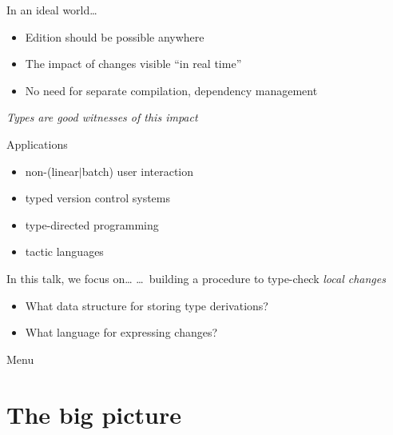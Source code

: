 \documentclass[ignorenonframetext,red]{beamer}
\begin{document}
\begin{frame}{In an ideal world\ldots}
  \begin{itemize}
  \item Edition should be possible anywhere
  \item The impact of changes visible “in real time”
  \item No need for separate compilation, dependency management
  \end{itemize}
  \pause
  \vspace{2em}
  \begin{center}
    {\large \it Types are good witnesses of this impact}
  \end{center}
  \vspace{1em}
  \pause
  \begin{block}{Applications}
    \small
    \begin{itemize}
    \item non-(linear$|$batch) user interaction
    \item typed version control systems
    \item type-directed programming
    \item tactic languages
    \end{itemize}
  \end{block}
\end{frame}

\begin{frame}{In this talk, we focus on\ldots}
  \ldots\ building a procedure to type-check \emph{local changes}

  \begin{itemize}
  \item What data structure for storing type derivations?
  \item What language for expressing changes?
  \end{itemize}
\end{frame}

\begin{frame}{Menu}
  \tableofcontents
\end{frame}

\section{The big picture}
\end{document}
